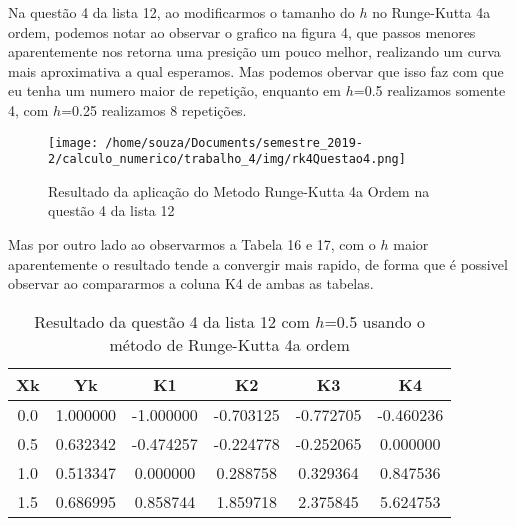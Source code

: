 \documentclass[12pt]{article}
\begin{document}
Na questão 4 da lista 12, ao modificarmos o tamanho do $h$ no Runge-Kutta 4a ordem, podemos notar ao observar o grafico na figura 4, que passos menores aparentemente nos retorna uma presição um pouco melhor, realizando um curva mais aproximativa a qual esperamos. Mas podemos obervar que isso faz com que eu tenha um numero maior de repetição, enquanto em $h$=0.5 realizamos somente 4, com $h$=0.25 realizamos 8 repetições.


\begin{figure}[!h]
    \centering
    \texttt{[image: /home/souza/Documents/semestre\_2019-2/calculo\_numerico/trabalho\_4/img/rk4Questao4.png]}
    \caption{Resultado da aplicação do Metodo Runge-Kutta 4a Ordem na questão 4 da lista 12}
\end{figure}

Mas por outro lado ao observarmos a Tabela 16 e 17, com o $h$ maior aparentemente o resultado tende a convergir mais rapido, de forma que é possivel observar ao compararmos a coluna K4 de ambas as tabelas.

\begin{table}[!h]
    \centering
\begin{tabular}{c|c|c|c|c|c}
\textbf{Xk} & \textbf{Yk} & \textbf{K1} & \textbf{K2} & \textbf{K3} & \textbf{K4} \\ \hline
0.0         & 1.000000    & -1.000000   & -0.703125   & -0.772705   & -0.460236   \\
0.5         & 0.632342    & -0.474257   & -0.224778   & -0.252065   & 0.000000    \\
1.0         & 0.513347    & 0.000000    & 0.288758    & 0.329364    & 0.847536    \\
1.5         & 0.686995    & 0.858744    & 1.859718    & 2.375845    & 5.624753    \\ \hline
\end{tabular}
    \caption{Resultado da questão 4 da lista 12 com $h$=0.5 usando o método de Runge-Kutta 4a ordem}
\end{table}
\end{document}
